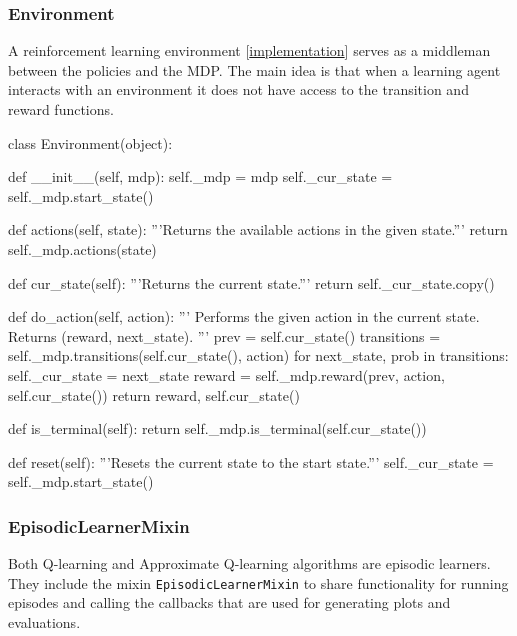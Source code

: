 \documentclass{article}
\newcommand{\GithubURL}[1]{[\href{https://github.com/davidrobles/mlnd-capstone-code/blob/master/#1}{implementation}]}
\begin{document}
\subsubsection{Environment}

A reinforcement learning environment \GithubURL{capstone/rl/environment.py} serves as a middleman
between the policies and the MDP. The main idea is that when a learning agent interacts with an
environment it does not have access to the transition and reward functions.

\begin{python}
class Environment(object):

    def __init__(self, mdp):
        self._mdp = mdp
        self._cur_state = self._mdp.start_state()

    def actions(self, state):
        '''Returns the available actions in the given state.'''
        return self._mdp.actions(state)

    def cur_state(self):
        '''Returns the current state.'''
        return self._cur_state.copy()

    def do_action(self, action):
        '''
        Performs the given action in the current state.
        Returns (reward, next_state).
        '''
        prev = self.cur_state()
        transitions = self._mdp.transitions(self.cur_state(), action)
        for next_state, prob in transitions:
            self._cur_state = next_state
        reward = self._mdp.reward(prev, action, self.cur_state())
        return reward, self.cur_state()

    def is_terminal(self):
        return self._mdp.is_terminal(self.cur_state())

    def reset(self):
        '''Resets the current state to the start state.'''
        self._cur_state = self._mdp.start_state()
\end{python}

\subsubsection{EpisodicLearnerMixin}

Both Q-learning and Approximate Q-learning algorithms are episodic learners. They include the mixin
\texttt{EpisodicLearnerMixin} to share functionality for running episodes and calling the callbacks
that are used for generating plots and evaluations.
\end{document}
